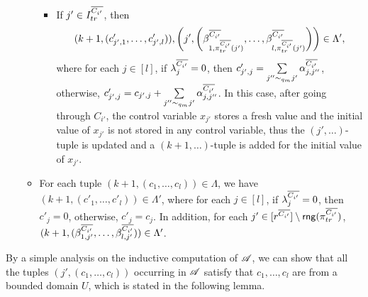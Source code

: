 \begin{enumerate}
\begin{itemize}
\begin{itemize}
\begin{itemize}
\end{itemize}
%
\item If $j' \in I^{\overline{C_{i'}}}_{tr}$, then 
$$(k+1, (c'_{j', 1}, \dots, c'_{j', l})), \left(j', \left(\beta^{\overline{C_{i'}}}_{1, \pi^{\overline{C_{i'}}}_{tr}(j')}, \dots, \beta^{\overline{C_{i'}}}_{l, \pi^{\overline{C_{i'}}}_{tr}(j')} \right) \right) \in \Lambda',$$ 
where for each $j \in [l]$, if $\lambda^{\overline{C_{i'}}}_j = 0$, then $c'_{j', j}= \sum \limits_{j'' \sim_{q_m} j'} \alpha^{\overline{C_{i'}}}_{j, j''} $, otherwise, $c'_{j', j} = c_{j',j} +  \sum \limits_{j'' \sim_{q_m} j'} \alpha^{\overline{C_{i'}}}_{j, j''}$. In this case, after going through $C_{i'}$, the control variable $x_{j'}$ stores a fresh value and the initial value of $x_{j'}$ is not stored in any control variable, thus the $(j',\dots)$-tuple is updated and a $(k+1,\dots)$-tuple is added for the initial value of $x_{j'}$.
%
\end{itemize}

\item For each tuple $(k+1, (c_1, \dots, c_l)) \in \Lambda$, we have $(k+1, (c'_1, \dots, c'_l)) \in \Lambda'$, where for each $j \in [l]$, if $\lambda^{\overline{C_{i'}}}_j = 0$, then $c'_{j}= 0$, otherwise, $c'_{j} = c_j$. In addition, for each $j' \in [r^{\overline{C_{i'}}}] \setminus \mathsf{rng}(\pi^{\overline{C_{i'}}}_{tr})$, $(k+1, (\beta^{\overline{C_{i'}}}_{1, j'}, \dots, \beta^{\overline{C_{i'}}}_{l, j'})) \in \Lambda'$. 
\end{itemize}
\end{enumerate}


By a simple analysis on the inductive computation of $\mathscr{A}$, we can show that all the tuples $(j', (c_1, \dots, c_l))$ occurring in $\mathscr{A}$ satisfy that $c_1,\dots, c_l$ are from a bounded domain $U$, which is stated in the following lemma.

